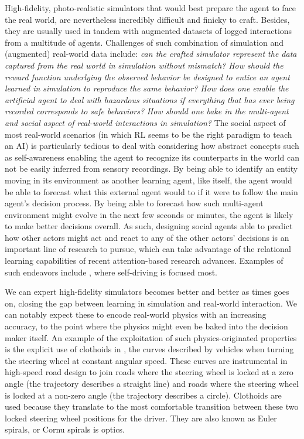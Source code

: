 High-fidelity, photo-realistic simulators that would best prepare the agent to face the real world,
are nevertheless incredibly difficult and finicky to craft.
Besides, they are usually used in tandem with augmented datasets of logged interactions from
a multitude of agents.
Challenges of such combination of simulation and (augmented) real-world data include:
\emph{can the crafted simulator represent the data captured from the real world in simulation
without mismatch?}
\emph{How should the reward function underlying the observed behavior be designed
to entice an agent learned in simulation to reproduce the same behavior?}
\emph{How does one enable the artificial agent to deal with hazardous situations if
everything that has ever being recorded corresponds to safe behaviors?}
\emph{How should one bake in the multi-agent and social aspect of real-world interactions in simulation?}
The social aspect of most real-world scenarios (in which RL seems to be the right paradigm to teach an AI)
is particularly tedious to deal with considering how abstract concepts such as self-awareness enabling the agent
to recognize its counterparts in the world can not be easily inferred from sensory recordings.
By being able to identify an entity moving in its environment as another learning agent, like itself,
the agent would be able to forecast what this external agent would to if it were to follow the main agent's
decision process. By being able to forecast how such multi-agent environment might evolve
in the next few seconds or minutes, the agent is likely to make better decisions overall.
As such, designing social agents able to predict how other actors might act and react to
any of the other actors' decisions is an important line of research to pursue,
which can take advantage of the relational learning capabilities of recent attention-based research advances.
Examples of such endeavors include
\cite{Bradley_Knox2013-jg,Alahi2016-vi,Leibo2017-lg,Tai2017-wq,Vemula2017-zd,
Li2018-wc,Gupta2018-cu,Kosaraju2019-ui,Zhou2020-hs,Ndousse2020-oz},
where self-driving is focused most.

We can expert high-fidelity simulators becomes better and better as times goes on,
closing the gap between learning in simulation and real-world interaction.
We can notably expect these to encode real-world physics with an increasing accuracy,
to the point where the physics might even be baked into the decision maker itself.
An example of the exploitation of such physics-originated properties is the explicit use
of clothoids in \cite{Zeng2020-co}, the curves described by vehicles when turning the steering wheel at
constant angular speed.
These curves are instrumental in high-speed road design to join roads where the steering wheel is locked
at a zero angle (the trajectory describes a straight line) and roads where the steering wheel is locked at a
non-zero angle (the trajectory describes a circle).
Clothoids are used because they translate to the most comfortable transition between these two
locked steering wheel positions for the driver.
They are also known as Euler spirals, or Cornu spirals is optics.

